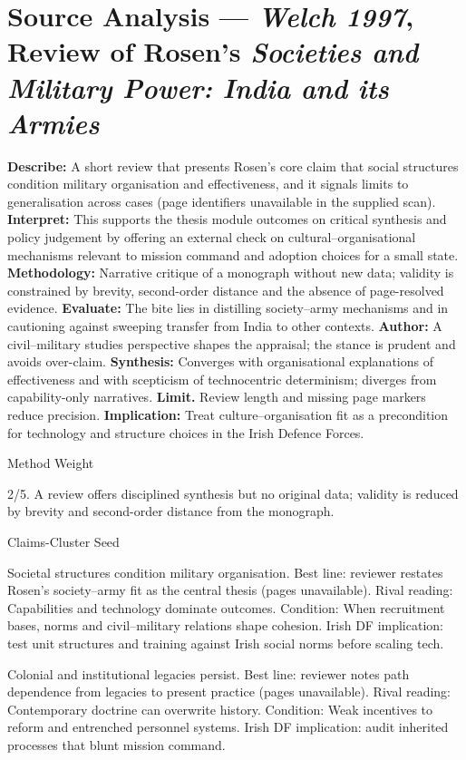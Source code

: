 \section*{Source Analysis — \textit{Welch 1997}, Review of Rosen’s \textit{Societies and Military Power: India and its Armies}}
\textbf{Describe:} A short review that presents Rosen’s core claim that social structures condition military organisation and effectiveness, and it signals limits to generalisation across cases (page identifiers unavailable in the supplied scan).
\textbf{Interpret:} This supports the thesis module outcomes on critical synthesis and policy judgement by offering an external check on cultural–organisational mechanisms relevant to mission command and adoption choices for a small state.
\textbf{Methodology:} Narrative critique of a monograph without new data; validity is constrained by brevity, second-order distance and the absence of page-resolved evidence.
\textbf{Evaluate:} The bite lies in distilling society–army mechanisms and in cautioning against sweeping transfer from India to other contexts.
\textbf{Author:} A civil–military studies perspective shapes the appraisal; the stance is prudent and avoids over-claim.
\textbf{Synthesis:} Converges with organisational explanations of effectiveness and with scepticism of technocentric determinism; diverges from capability-only narratives.
\textbf{Limit.} Review length and missing page markers reduce precision.
\textbf{Implication:} Treat culture–organisation fit as a precondition for technology and structure choices in the Irish Defence Forces.

Method Weight

2/5. A review offers disciplined synthesis but no original data; validity is reduced by brevity and second-order distance from the monograph.

Claims-Cluster Seed

Societal structures condition military organisation.
Best line: reviewer restates Rosen’s society–army fit as the central thesis (pages unavailable).
Rival reading: Capabilities and technology dominate outcomes.
Condition: When recruitment bases, norms and civil–military relations shape cohesion.
Irish DF implication: test unit structures and training against Irish social norms before scaling tech.

Colonial and institutional legacies persist.
Best line: reviewer notes path dependence from legacies to present practice (pages unavailable).
Rival reading: Contemporary doctrine can overwrite history.
Condition: Weak incentives to reform and entrenched personnel systems.
Irish DF implication: audit inherited processes that blunt mission command.


